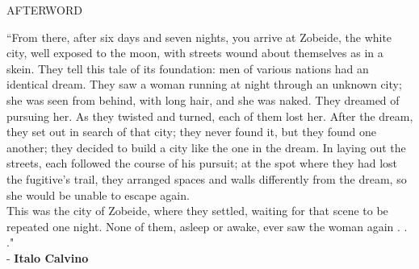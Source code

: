 \documentclass[12pt]{article}
\begin{document}
\vspace*{1\baselineskip}

\begingroup
\begin{center}
\huge AFTERWORD
\end{center}
\endgroup

\vspace*{2\baselineskip}

\begingroup
\begin{center}
``From there, after six days and seven nights, you arrive at Zobeide, the white city, well exposed to the moon, with streets wound about themselves as in a skein. They tell this tale of its foundation: men of various nations had an identical dream. They saw a woman running at night through an unknown city; she was seen from behind, with long hair, and she was naked. They dreamed of pursuing her. As they twisted and turned, each of them lost her. After the dream, they set out in search of that city; they never found it, but they found one another; they decided to build a city like the one in the dream. In laying out the streets, each followed the course of his pursuit; at the spot where they had lost the fugitive's trail, they arranged spaces and walls differently from the dream, so she would be unable to escape again. \\
This was the city of Zobeide, where they settled, waiting for that scene to be repeated one night. None of them, asleep or awake, ever saw the woman again . . ." \\
- \textbf{Italo Calvino}
\end{center}
\endgroup

\vspace*{2\baselineskip}
\end{document}
